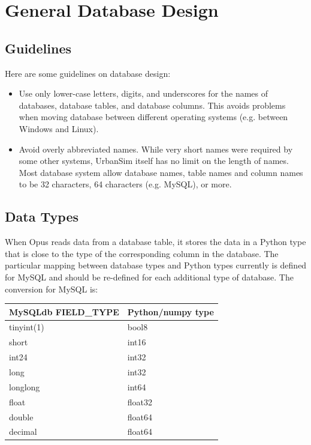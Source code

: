 \section{General Database Design}

\subsection{Guidelines}

Here are some guidelines on database design:

\begin{itemize}
\item Use only lower-case letters, digits, and underscores for the names of
databases, database tables, and database columns. This avoids problems when
moving database between different operating systems (e.g. between Windows and
Linux).
\item Avoid overly abbreviated names.  While very short names were required by
some other systems, UrbanSim itself has no limit on the length of names. Most
database system allow database names, table names and column names to be 32
characters, 64 characters (e.g. MySQL), or more.
\end{itemize}

\subsection{Data Types}

   When Opus reads data from a database table, it stores the
data in a Python type that is close to the type of the corresponding
column in the database.  The particular mapping between database
types and Python types currently is defined for MySQL
and should be re-defined for each additional type of database.  The
conversion for MySQL is:

\begin{tabular}{ll}
MySQLdb FIELD_TYPE & Python/numpy type \\
\hline
tinyint(1) & bool8 \\
short & int16 \\
int24 & int32 \\
long & int32 \\
longlong & int64 \\
float & float32 \\
double & float64 \\
decimal & float64 \\
\end{tabular}

